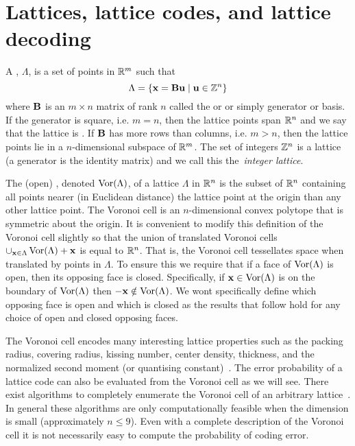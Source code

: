 \documentclass[draftcls, onecolumn, 11pt]{IEEEtran}
\begin{document}
\section{Lattices, lattice codes, and lattice decoding} \label{sec:latt-latt-codes}


A , $\Lambda$, is a set of points in ${\mathbb R}^m$ such that
\[ 
   \Lambda = \{\mathbf{x} = \mathbf{B}\mathbf{u} \mid \mathbf{u} \in {\mathbb Z}^n \}
 \]
 where $\mathbf{B}$ is an $m \times n$ matrix of rank $n$ called the  or  or simply generator or basis.  If the generator is square, i.e. $m = n$, then the lattice points span ${\mathbb R}^n$ and we say that the lattice is . If $\mathbf{B}$ has more rows than columns, i.e. $m > n$, then the lattice points lie in a $n$-dimensional subspace of ${\mathbb R}^m$. The set of integers ${\mathbb Z}^n$ is a lattice (a generator is the identity matrix) and we call this the~\emph{integer lattice}.  

The (open) , denoted $\operatorname{Vor}(\Lambda)$, of a lattice $\Lambda$ in ${\mathbb R}^n$ is the subset of ${\mathbb R}^n$ containing all points nearer (in Euclidean distance) the lattice point at the origin than any other lattice point. The Voronoi cell is an $n$-dimensional convex polytope that is symmetric about the origin.  It is convenient to modify this definition of the Voronoi cell slightly so that the union of translated Voronoi cells $\cup_{\mathbf{x} \in \Lambda}\operatorname{Vor}(\Lambda) + \mathbf{x}$ is equal to  ${\mathbb R}^n$.  That is, the Voronoi cell tessellates space when translated by points in $\Lambda$.  To ensure this we require that if a face of $\operatorname{Vor}(\Lambda)$ is open, then its opposing face is closed. Specifically, if $\mathbf{x} \in \operatorname{Vor}(\Lambda)$ is on the boundary of $\operatorname{Vor}(\Lambda)$ then $-\mathbf{x} \notin \operatorname{Vor}(\Lambda)$.  We wont specifically define which opposing face is open and which is closed as the results that follow hold for any choice of open and closed opposing faces.  

The Voronoi cell encodes many interesting lattice properties such as the packing radius, covering radius, kissing number, center density, thickness, and the normalized second moment (or quantising constant)~\cite{Viterbo_diamond_cutting_1996, SPLAG}. The error probability of a lattice code can also be evaluated from the Voronoi cell as we will see.  There exist algorithms to completely enumerate the Voronoi cell of an arbitrary lattice~\cite{Viterbo_diamond_cutting_1996,Sikiric_complex_algs_vor_cells_2009,Sikiric_vor_reduction_covering_2008,Valentin2003_coverings_tilings_low_dimension}.  In general these algorithms are only computationally feasible when the dimension is small (approximately $n \leq 9$).  Even with a complete description of the Voronoi cell it is not necessarily easy to compute the probability of coding error.  
\end{document}
